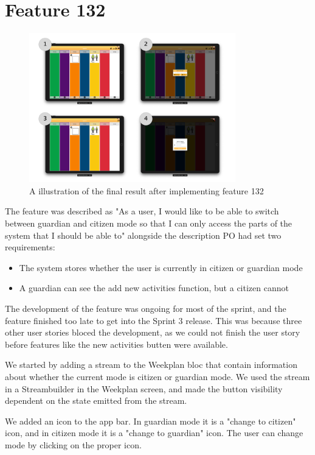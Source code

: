 \section{Feature 132}
\begin{figure}[h]
    \centering
    \includegraphics[width=0.8\textwidth]{figures/feature_132.pdf}
    \caption{A illustration of the final result after implementing feature 132}
    \label{fig:feature132}
\end{figure}
The feature was described as "As a user, I would like to be able to switch between guardian and citizen mode so that I can only access the parts of the system that I should be able to" alongside the description \gls{PO} had set two requirements:

\begin{itemize}
  \item The system stores whether the user is currently in citizen or guardian mode
  \item A guardian can see the add new activities function, but a citizen cannot
\end{itemize}

The development of the feature was ongoing for most of the sprint, and the feature finished too late to get into the Sprint 3 release. This was because three other user stories bloced the development, as we could not finish the user story before features like the new activities butten were available.

We started by adding a stream to the Weekplan \gls{bloc} that contain information about whether the current mode is citizen or guardian mode. We used the stream in a Streambuilder in the Weekplan screen, and made the button visibility dependent on the state emitted from the stream.

We added an icon to the app bar. In guardian mode it is a "change to citizen" icon, and in citizen mode it is a "change to guardian" icon. The user can change mode by clicking on the proper icon.

